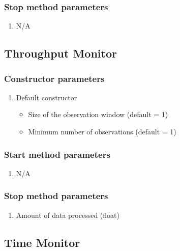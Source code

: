 \subsubsection*{Stop method parameters}
\begin{enumerate}
	\item[] N/A
\end{enumerate}




\subsection{Throughput Monitor}

\subsubsection*{Constructor parameters}
\begin{enumerate}
	\item Default constructor
		\begin{itemize}
			\item Size of the observation window (default = 1)
			\item Minimum number of observations (default = 1)
		\end{itemize}
\end{enumerate}

\subsubsection*{Start method parameters}
\begin{enumerate}
	\item[] N/A
\end{enumerate}


\subsubsection*{Stop method parameters}
\begin{enumerate}
	\item Amount of data processed (float)
\end{enumerate}





\subsection{Time Monitor}

